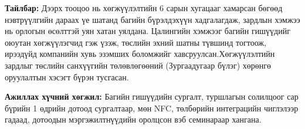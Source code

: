 \noindent\textbf{Тайлбар:} Дээрх тооцоо нь хөгжүүлэлтийн 6 сарын
хугацааг хамарсан бөгөөд нэвтрүүлгийн дараах үе шатанд багийн
бүрэлдэхүүн хадгалагдаж, зардлын хэмжээ нь орлогын өсөлттэй
уян хатан уялдана. Цалингийн хэмжээг багийн гишүүдийг оюутан
хөгжүүлэгчид гэж үзэж, төслийн эхний шатны түвшинд тогтоож,
ирээдүйд компанийн хувь эзэмших боломжийг хавсруулсан.Хөгжүүлэлтийн зардлыг төслийн санхүүгийн төлөвлөгөөний (Зургаадугаар
бүлэг) хөрөнгө оруулалтын хэсэгт бүрэн тусгасан.

\noindent\textbf{Ажиллах хүчний хөгжил:} Багийн гишүүдийн сургалт,
туршлагын солилцоог сар бүрийн 1 өдрийн дотоод сургалтаар, мөн NFC,
төлбөрийн интеграцийн чиглэлээр гадаад, дотоодын мэргэжилтнүүдийн оролцсон
вэб семинараар хангана.
